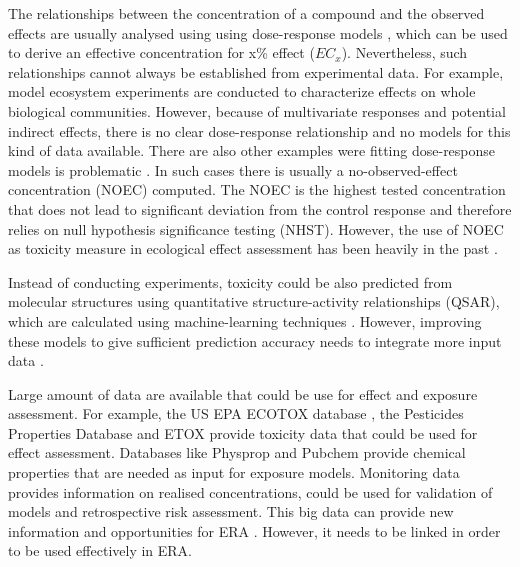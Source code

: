 The relationships between the concentration of a compound and the observed effects are usually analysed using using dose-response models \citep{ritz_toward_2010}, which can be used to derive an effective concentration for x\% effect ($EC_{x}$). 
Nevertheless, such relationships cannot always be established from experimental data.
For example, model ecosystem experiments are conducted to characterize effects on whole biological communities.
However, because of multivariate responses and potential indirect effects, there is no clear dose-response relationship and no models for this kind of data available. 
There are also other examples were fitting dose-response models is problematic \citep{green_issues_2016}. 
In such cases there is usually a no-observed-effect concentration (NOEC) computed. 
The NOEC is the highest tested concentration that does not lead to significant deviation from the control response and therefore relies on null hypothesis significance testing (NHST). 
However, the use of NOEC as toxicity measure in ecological effect assessment has been heavily in the past \citep{laskowski_good_1995, chapman_warning:_1996, warne_noec_2008, fox_what_2012, jager_bad_2012, fox_dont_2016}. 

Instead of conducting experiments, toxicity could be also predicted from molecular structures using quantitative structure-activity relationships (QSAR), which are calculated using machine-learning techniques \citep{murrell_chemically_2015, cortes-ciriano_bioalerts:_2016}. 
However, improving these models to give sufficient prediction accuracy needs to integrate more input data \citep{kuhne_read-across_2013}.

Large amount of data are available that could be use for effect and exposure assessment. 
For example, the US EPA ECOTOX database \citep{u.s._epa_ecotoxicology_2016}, the Pesticides Properties Database \citep{lewis_international_2016} and ETOX \citep{umweltbundesamt_etox:_2016} provide toxicity data that could be used for effect assessment.
Databases like Physprop \citep{howard_physical/chemical_2016} and Pubchem \citep{kim_pubchem_2016} provide chemical properties that are needed as input for exposure models.
Monitoring data provides information on realised concentrations, could be used for validation of models and retrospective risk assessment.
This big data can provide new information and opportunities for ERA \citep{dafforn_big_2015}. 
However, it needs to be linked in order to be used effectively in ERA.












